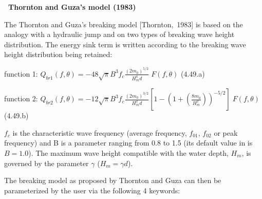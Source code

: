 {\bf  ~Thornton and Guza's model (1983)}

 The Thornton and Guza's breaking model [Thornton,~1983] is based on the analogy with a hydraulic jump and on two types of breaking wave height distribution. The energy sink term is written according to the breaking wave height distribution being retained:

function 1: $Q_{br1} \left(f,\theta \right)=-48\sqrt{\pi } B^{3} f_{c} \frac{\left(2m_{0} \right)^{5/2} }{H_{m}^{4} d} \; F\left(f,\theta \right)$ (4.49.a)

function 2: $Q_{br2} \left(f,\theta \right)=-12\sqrt{\pi } B^{3} f_{c} \frac{\left(2m_{0} \right)^{3/2} }{H_{m}^{2} d} \left[1-\left(1+\left(\frac{8m_{0} }{H_{m}^{2} } \right)\right)^{-5/2} \right]\; F\left(f,\theta \right)$ (4.49.b)

 $f_{c} $ is the characteristic wave frequency (average frequency, $f_{01} $, $f_{02} $ or peak frequency) and B is a parameter ranging from 0.8 to 1.5 (its default value in \tomawac is $B=1.0$). The maximum wave height compatible with the water depth, $H_{m} $, is governed by the parameter $\gamma $ ($H_{m} =\gamma d$).

 The breaking model as proposed by Thornton and Guza can then be parameterized by the user via the following 4 keywords:

